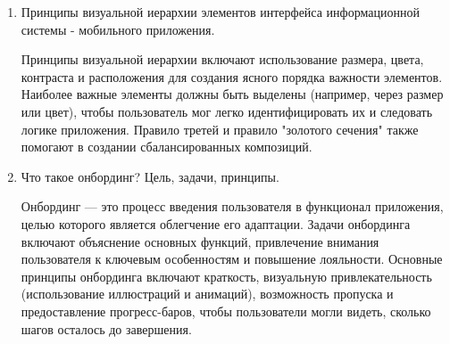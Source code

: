 \begin{enumerate}
    \item Принципы визуальной иерархии элементов интерфейса информационной системы - мобильного приложения.

    Принципы визуальной иерархии включают использование размера, цвета, контраста и расположения для создания ясного порядка важности элементов. Наиболее важные элементы должны быть выделены (например, через размер или цвет), чтобы пользователь мог легко идентифицировать их и следовать логике приложения. Правило третей и правило "золотого сечения" также помогают в создании сбалансированных композиций.

    \item Что такое онбординг? Цель, задачи, принципы.

    Онбординг — это процесс введения пользователя в функционал приложения, целью которого является облегчение его адаптации. Задачи онбординга включают объяснение основных функций, привлечение внимания пользователя к ключевым особенностям и повышение лояльности. Основные принципы онбординга включают краткость, визуальную привлекательность (использование иллюстраций и анимаций), возможность пропуска и предоставление прогресс-баров, чтобы пользователи могли видеть, сколько шагов осталось до завершения.
\end{enumerate}


